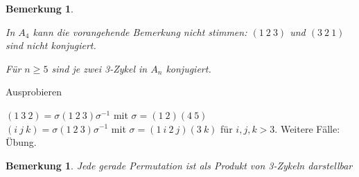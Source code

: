 \documentclass[a4paper,10pt,german]{scrbook}
\theoremstyle{saetze}
\theoremstyle{definitionen}
\newtheorem{Bem}[Def]{Bemerkung}
\begin{document}
\begin{Bem}
\label{konj3zykel}
\begin{enum}
\item In $A_4$ kann die vorangehende Bemerkung nicht stimmen: $(1\ 2\ 3)$ und $(3\ 2\ 1)$ sind nicht konjugiert.
\item Für $n\ge 5$ sind je zwei 3-Zykel in $A_n$ konjugiert.
\end{enum}
\end{Bem}

\bew{}
{\item Ausprobieren
\item $(1\ 3\ 2) = \sigma (1\ 2\ 3)\sigma^{-1}$ mit $\sigma = (1\ 2)(4\ 5)$\\
      $(i\ j\ k) = \sigma (1\ 2\ 3)\sigma^{-1}$ mit $\sigma = (1\ i\ 2\ j)(3\ k)$ für $i,j,k>3$. Weitere Fälle: Übung.
}

\begin{Bem}
\label{gerPerm3Zykel}
Jede gerade Permutation ist als Produkt von 3-Zykeln darstellbar
\end{Bem}

\end{document}
